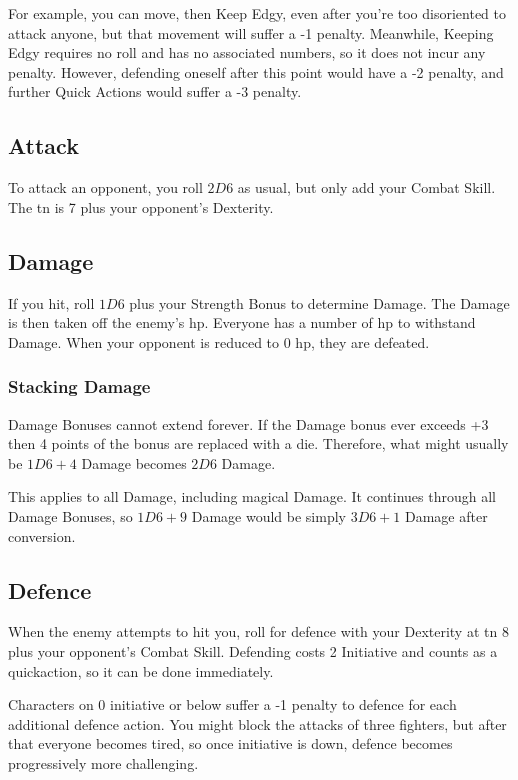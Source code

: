 \begin{multicols}{2}
For example, you can move, then Keep Edgy, even after you're too disoriented to attack anyone, but that movement will suffer a -1 penalty.
Meanwhile, Keeping Edgy requires no roll and has no associated numbers, so it does not incur any penalty.
However, defending oneself after this point would have a -2 penalty, and further Quick Actions would suffer a -3 penalty.

\initiativechart

\subsection{Attack}

To attack an opponent, you roll $2D6$ as usual, but only add your Combat Skill.
The \gls{tn} is 7 plus your opponent's Dexterity.

\subsection{Damage}

If you hit, roll $1D6$ plus your Strength Bonus to determine Damage.
The Damage is then taken off the enemy's \gls{hp}.
Everyone has a number of \gls{hp} to withstand Damage. When your opponent is reduced to 0 \gls{hp}, they are defeated.

\subsubsection{Stacking Damage}

Damage Bonuses cannot extend forever. If the Damage bonus ever exceeds +3 then 4 points of the bonus are replaced with a die. Therefore, what might usually be $1D6+4$ Damage becomes $2D6$ Damage.

This applies to all Damage, including magical Damage. It continues through all Damage Bonuses, so $1D6+9$ Damage would be simply $3D6+1$ Damage after conversion.

\subsection{Defence}

When the enemy attempts to hit you, roll for defence with your Dexterity at \gls{tn} 8 plus your opponent's Combat Skill.
Defending costs 2 Initiative and counts as a \gls{quickaction}, so it can be done immediately.

Characters on 0 initiative or below suffer a -1 penalty to defence for each additional defence action.
You might block the attacks of three fighters, but after that everyone becomes tired, so once initiative is down, defence becomes progressively more challenging.


\end{multicols}
